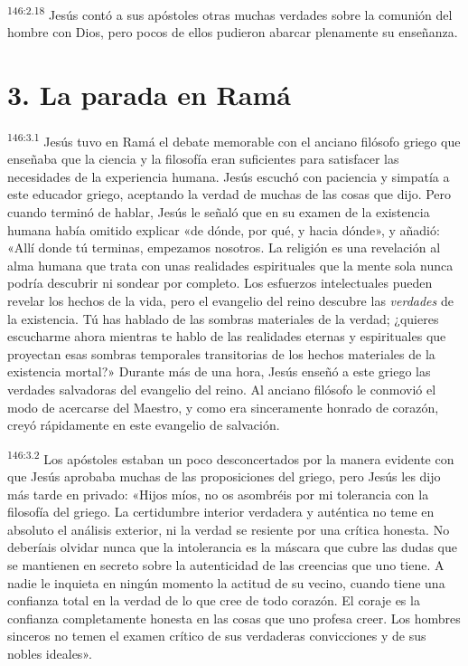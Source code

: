 \par 
\textsuperscript{146:2.18} Jesús contó a sus apóstoles otras muchas verdades sobre la comunión del hombre con Dios, pero pocos de ellos pudieron abarcar plenamente su enseñanza.

\section*{3. La parada en Ramá}
\par 
\textsuperscript{146:3.1} Jesús tuvo en Ramá el debate memorable con el anciano filósofo griego que enseñaba que la ciencia y la filosofía eran suficientes para satisfacer las necesidades de la experiencia humana. Jesús escuchó con paciencia y simpatía a este educador griego, aceptando la verdad de muchas de las cosas que dijo. Pero cuando terminó de hablar, Jesús le señaló que en su examen de la existencia humana había omitido explicar «de dónde, por qué, y hacia dónde», y añadió: «Allí donde tú terminas, empezamos nosotros. La religión es una revelación al alma humana que trata con unas realidades espirituales que la mente sola nunca podría descubrir ni sondear por completo. Los esfuerzos intelectuales pueden revelar los hechos de la vida, pero el evangelio del reino descubre las \textit{verdades} de la existencia. Tú has hablado de las sombras materiales de la verdad; ¿quieres escucharme ahora mientras te hablo de las realidades eternas y espirituales que proyectan esas sombras temporales transitorias de los hechos materiales de la existencia mortal?» Durante más de una hora, Jesús enseñó a este griego las verdades salvadoras del evangelio del reino. Al anciano filósofo le conmovió el modo de acercarse del Maestro, y como era sinceramente honrado de corazón, creyó rápidamente en este evangelio de salvación.

\par 
\textsuperscript{146:3.2} Los apóstoles estaban un poco desconcertados por la manera evidente con que Jesús aprobaba muchas de las proposiciones del griego, pero Jesús les dijo más tarde en privado: «Hijos míos, no os asombréis por mi tolerancia con la filosofía del griego. La certidumbre interior verdadera y auténtica no teme en absoluto el análisis exterior, ni la verdad se resiente por una crítica honesta. No deberíais olvidar nunca que la intolerancia es la máscara que cubre las dudas que se mantienen en secreto sobre la autenticidad de las creencias que uno tiene. A nadie le inquieta en ningún momento la actitud de su vecino, cuando tiene una confianza total en la verdad de lo que cree de todo corazón. El coraje es la confianza completamente honesta en las cosas que uno profesa creer. Los hombres sinceros no temen el examen crítico de sus verdaderas convicciones y de sus nobles ideales».

